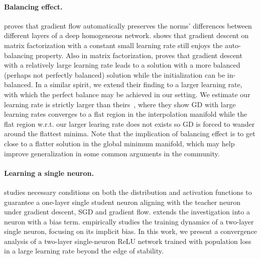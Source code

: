 \documentclass{article}
\newcommand{\citet}[1]{\cite{#1}}
\newcommand{\citep}[1]{\cite{#1}}
\theoremstyle{plain}
\theoremstyle{remark}
\newcommand{\lei}[1]{\noindent{\color{red}{[Lei: #1]}}}
\begin{document}
\paragraph{Balancing effect.} \citet{du2018algorithmic} proves that gradient flow automatically preserves the norms' differences between different layers of a deep homogeneous network. \citep{ye2021global} shows that gradient descent on matrix factorization with a constant small learning rate still enjoys the auto-balancing property. Also in matrix factorization, \citet{wang2021large} proves that gradient descent with a relatively large learning rate leads to a solution with a more balanced (perhaps not perfectly balanced) solution while the initialization can be in-balanced. In a similar spirit, we extend their finding to a larger learning rate, with which the perfect balance may be achieved in our setting. We estimate our learning rate is {strictly larger than} theirs~\citep{wang2021large}, where they show GD with large learning rates converges to a flat region in the interpolation manifold while the flat region w.r.t. our larger learing rate does not exists so GD is forced to wander around the flattest minima. Note that the implication of balancing effect is to get close to a flatter solution in the global minimum manifold, which may help improve generalization in some common arguments in the community.

\paragraph{Learning a single neuron.} \citet{yehudai2020learning} studies necessary conditions on both the distribution and activation functions to guarantee a one-layer single student neuron aligning with the teacher neuron under gradient descent, SGD and gradient flow. \citet{vardi2021learning} extends the investigation into a neuron with a bias term. \citet{vardi2021implicit} empirically studies the training dynamics of a two-layer single neuron, focusing on its implicit bias. In this work, we present a convergence analysis of a two-layer single-neuron ReLU network trained with population loss in a large learning rate beyond the edge of stability.%


\end{document}
